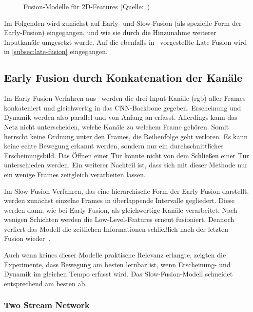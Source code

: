 \begin{figure}[h!]
    \centering
    \caption{Fusion-Modelle für 2D-Features (Quelle:~\cite{Karpathy14})}
    \label{fig:fusion-types}
\end{figure}

Im Folgenden wird zunächst auf Early- und Slow-Fusion (als spezielle Form der Early-Fusion) eingegangen, und wie sie durch die Hinzunahme weiterer Inputkanäle umgesetzt wurde.
Auf die ebenfalls in~\cite{Karpathy14} vorgestellte Late Fusion wird in \autoref{subsec:late-fusion} eingegangen.

\subsection{Early Fusion durch Konkatenation der Kanäle}
\label{subsec:early-fusion}

Im Early-Fusion-Verfahren aus~\cite{Karpathy14} werden die drei Input-Kanäle (\gls{rgb}) aller Frames konkateniert und gleichwertig in das CNN-Backbone gegeben.
Erscheinung und Dynamik werden also parallel und von Anfang an erfasst.
Allerdings kann das Netz nicht unterscheiden, welche Kanäle zu welchem Frame gehören.
Somit herrscht keine Ordnung unter den Frames, \dh die Reihenfolge geht verloren.
Es kann keine echte Bewegung erkannt werden, sondern nur ein durchschnittliches Erscheinungsbild.
Das Öffnen einer Tür könnte \zB nicht von dem Schließen einer Tür unterschieden werden.
Ein weiterer Nachteil ist, dass sich mit dieser Methode nur ein wenige Frames zeitgleich verarbeiten lassen.

Im Slow-Fusion-Verfahren, das eine hierarchische Form der Early Fusion darstellt, werden zunächst einzelne Frames in überlappende Intervalle gegliedert.
Diese werden dann, wie bei Early Fusion, als gleichwertige Kanäle verarbeitet.
Nach wenigen Schichten werden die Low-Level-Features erneut fusioniert.
Dennoch verliert das Modell die zeitlichen Informationen schließlich nach der letzten Fusion wieder~\cite{Tran15}.

Auch wenn keines dieser Modelle praktische Relevanz erlangte, zeigten die Experimente, dass Bewegung am besten lernbar ist, wenn Erscheinung- und Dynamik im gleichen Tempo erfasst wird.
Das Slow-Fusion-Modell schneidet entsprechend am besten ab.

\subsubsection{Two Stream Network}

